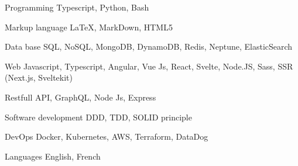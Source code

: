 


\begin{cvskills}


\cvskill
{Programming} %
{Typescript, Python, Bash} %


\cvskill
{Markup language} %
{LaTeX, MarkDown, HTML5} %



\cvskill
{Data base} %
{SQL, NoSQL, MongoDB, DynamoDB, Redis, Neptune, ElasticSearch} %


\cvskill
{Web} %
{Javascript, Typescript, Angular, Vue Js, React, Svelte, Node.JS, Sass, SSR (Next.js, Sveltekit) } %


\cvskill
{} %
{Restfull API, GraphQL, Node Js, Express} %




\cvskill
{Software development} %
{DDD, TDD, SOLID principle} %



\cvskill
{DevOps} %
{Docker, Kubernetes, AWS, Terraform, DataDog} %


\cvskill
{Languages} %
{English, French} %


\end{cvskills}
